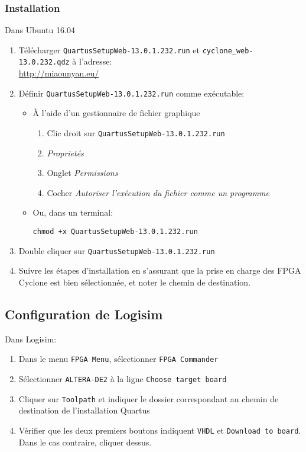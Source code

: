 \subsubsection{Installation}
\noindent Dans Ubuntu 16.04
\begin{enumerate}
	\item Télécharger \texttt{QuartusSetupWeb-13.0.1.232.run} et \texttt{cyclone\_web-13.0.232.qdz} à l'adresse: \\
	\textcolor{blue}{\url{http://miaounyan.eu/}}
	\item Définir \texttt{QuartusSetupWeb-13.0.1.232.run} comme exécutable:
		\begin{itemize}
			\item À l'aide d'un gestionnaire de fichier graphique
			\begin{enumerate}
				\item Clic droit sur \texttt{QuartusSetupWeb-13.0.1.232.run}
				\item \textit{Proprietés}
				\item Onglet \textit{Permissions}
				\item Cocher \textit{Autoriser l'exécution du fichier comme un programme}
			\end{enumerate}
\vspace{0.2em}
			\item Ou, dans un terminal:
			\begin{lstlisting}
chmod +x QuartusSetupWeb-13.0.1.232.run
			\end{lstlisting}
		\end{itemize}
	\item Double cliquer sur \texttt{QuartusSetupWeb-13.0.1.232.run}
	\item Suivre les étapes d'installation en s'assurant que la prise en charge des FPGA Cyclone est bien sélectionnée, et noter le chemin de destination.
\end{enumerate}

\subsection{Configuration de Logisim}
\noindent Dans Logisim:
\begin{enumerate}
	\item Dans le menu \texttt{FPGA Menu}, sélectionner \texttt{FPGA Commander}
	\item Sélectionner \texttt{ALTERA-DE2} à la ligne \texttt{Choose target board}
	\item Cliquer sur \texttt{Toolpath} et indiquer le dossier correspondant au chemin de destination de l'installation Quartus
	\item Vérifier que les deux premiers boutons indiquent \texttt{VHDL} et \texttt{Download to board}. Dans le cas contraire, cliquer dessus.
\end{enumerate}

